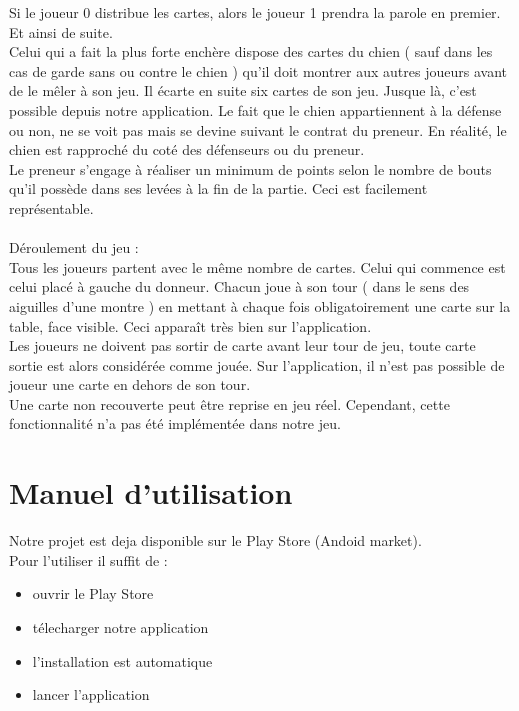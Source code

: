 \documentclass[a4paper]{report}
\begin{document}
		Si le joueur 0 distribue les cartes, alors le joueur 1 prendra la parole en premier. Et ainsi de suite.\\
   		Celui qui a fait la plus forte enchère dispose des cartes du chien ( sauf dans les cas de garde sans ou contre le chien ) qu'il doit montrer aux autres joueurs avant de le mêler à son 		jeu. Il écarte en suite six cartes de son jeu. Jusque là, c’est possible depuis notre application. Le fait que le chien appartiennent à la défense ou non, ne se voit pas mais se devine 			suivant le contrat du preneur. En réalité, le chien est rapproché du coté des défenseurs ou du preneur.\\
    		Le preneur s'engage à réaliser un minimum de points selon le nombre de bouts qu'il possède dans ses levées à la fin de la partie. Ceci est facilement représentable.\\
   		\\ 
		Déroulement du jeu :\\
  		Tous les joueurs partent avec le même nombre de cartes. Celui qui commence est celui placé à gauche du donneur. Chacun joue à son tour ( dans le sens des aiguilles d'une montre ) en 			mettant à chaque fois obligatoirement une carte sur la table, face visible. Ceci apparaît très bien sur l’application.\\
   		Les joueurs ne doivent pas sortir de carte avant leur tour de jeu, toute carte sortie est alors considérée comme jouée. Sur l’application, il n’est pas possible de joueur une carte en 		dehors de son tour.\\
    		Une carte non recouverte peut être reprise en jeu réel. Cependant, cette fonctionnalité n’a pas été implémentée dans notre jeu.\\


\chapter{Manuel d’utilisation}

Notre projet est deja disponible sur le Play Store (Andoid market).\\
Pour l'utiliser il suffit de :
\begin{itemize}
	\item ouvrir le Play Store
	\item télecharger notre application
	\item l'installation est automatique
	\item lancer l'application
\end{itemize}
\end{document}
